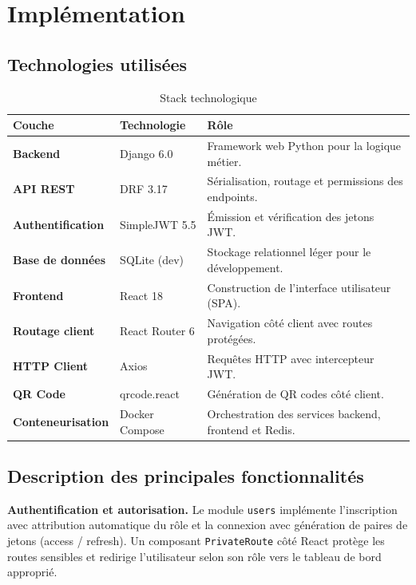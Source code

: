 \documentclass[12pt, a4paper]{article}
\begin{document}
\section{Implémentation}

\subsection{Technologies utilisées}

\begin{table}[h!]
\centering
\caption{Stack technologique}
\label{tab:tech}
\small
\begin{tabular}{>{\bfseries}p{3cm} p{3.5cm} p{6.5cm}}
\toprule
Couche & Technologie & Rôle \\
\midrule
Backend & Django 6.0 & Framework web Python pour la logique métier. \\
API REST & DRF 3.17 & Sérialisation, routage et permissions des endpoints. \\
Authentification & SimpleJWT 5.5 & Émission et vérification des jetons JWT. \\
Base de données & SQLite (dev) & Stockage relationnel léger pour le développement. \\
Frontend & React 18 & Construction de l'interface utilisateur (SPA). \\
Routage client & React Router 6 & Navigation côté client avec routes protégées. \\
HTTP Client & Axios & Requêtes HTTP avec intercepteur JWT. \\
QR Code & qrcode.react & Génération de QR codes côté client. \\
Conteneurisation & Docker Compose & Orchestration des services backend, frontend et Redis. \\
\bottomrule
\end{tabular}
\end{table}

\subsection{Description des principales fonctionnalités}

\textbf{Authentification et autorisation.} Le module \texttt{users} implémente l'inscription avec attribution automatique du rôle et la connexion avec génération de paires de jetons (access / refresh). Un composant \texttt{PrivateRoute} côté React protège les routes sensibles et redirige l'utilisateur selon son rôle vers le tableau de bord approprié.
\end{document}
